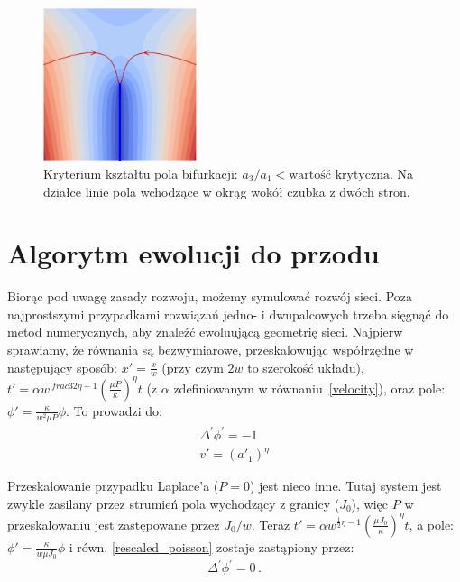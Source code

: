 \documentclass[]{pracamgr}
\begin{document}
      \begin{figure}[H]
        \centering
        \includegraphics[width=0.4\textwidth]{figs/bifurcation_rule_a3.png}
        \caption{Kryterium kształtu pola bifurkacji: $a_3/a_1 < \textrm{wartość krytyczna} $. Na działce linie pola wchodzące w okrąg wokół czubka z dwóch stron.} 
        \label{bif_rule_a3}
      \end{figure}


    \section{Algorytm ewolucji do przodu}

      Biorąc pod uwagę zasady rozwoju, możemy symulować rozwój sieci. Poza najprostszymi przypadkami rozwiązań jedno- i dwupalcowych \cite{gubiec2008fingered} trzeba sięgnąć do metod numerycznych, aby znaleźć ewoluującą geometrię sieci. Najpierw sprawiamy, że równania są bezwymiarowe, przeskalowując współrzędne w następujący sposób: $x' = \frac{x}{w}$ (przy czym $2w$ to szerokość układu), $t' = \alpha w^{\ frac{3}{2}\eta-1} (\frac{\mu P}{\kappa})^{\eta} t$ (z $\alpha$ zdefiniowanym w równaniu~\ref{velocity}), oraz pole: $\phi' = \frac{\kappa}{w^2 \mu P}\phi$. To prowadzi do:
      \begin{gather}
        \label{rescaled_poisson} \Delta^\prime \phi^\prime = -1 \\ 
        \label{rescaled_vel} v' = (a'_1)^\eta
      \end{gather}

      Przeskalowanie przypadku Laplace'a ($P=0$) jest nieco inne. Tutaj system jest zwykle zasilany przez strumień pola wychodzący z granicy ($J_0$), więc $P$ w przeskalowaniu jest zastępowane przez $J_0 / w$. Teraz $t' = \alpha w^{\frac{1}{2}\eta-1} (\frac{\mu J_0}{\kappa})^{\eta} t$, a pole: $ \phi' = \frac{\kappa}{w \mu J_0}\phi$ i równ. \eqref{rescaled_poisson} zostaje zastąpiony przez:
      \begin{equation}
        \Delta^\prime \phi^\prime = 0 \,.
      \end{equation}
\end{document}
